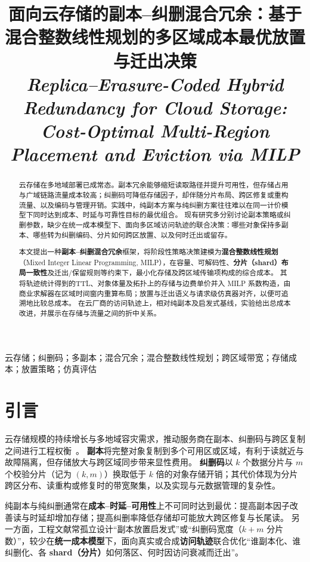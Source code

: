 \documentclass[conference]{IEEEtran}
\title{面向云存储的副本--纠删混合冗余：基于混合整数线性规划的多区域成本最优放置与迁出决策\\[0.35em]
{\normalsize\itshape Replica--Erasure-Coded Hybrid Redundancy for Cloud Storage: Cost-Optimal Multi-Region Placement and Eviction via MILP}}
\author{
\IEEEauthorblockN{作者姓名}
\IEEEauthorblockA{\textit{单位院系}\\
城市，国家，电子邮箱}
}
\begin{document}
\maketitle
\begin{abstract}
云存储在多地域部署已成常态。副本冗余能够缩短读取路径并提升可用性，但存储占用与广域链路流量成本较高；纠删码可降低存储因子，却伴随分片布局、跨区修复或重构流量、以及编码与管理开销。实践中，纯副本方案与纯纠删方案往往难以在同一计价模型下同时达到成本、时延与可靠性目标的最优组合。
现有研究多分别讨论副本策略或纠删参数，缺少在统一成本模型下、面向多区域访问轨迹的联合决策：哪些对象保持多副本、哪些转为纠删编码、分片如何跨区放置、以及何时迁出或留存。

本文提出一种\textbf{副本--纠删混合冗余}框架，将阶段性策略决策建模为\textbf{混合整数线性规划}（Mixed Integer Linear Programming, MILP），在容量、可解码性、\textbf{分片（shard）布局一致性}及迁出/保留规则等约束下，最小化存储及跨区域传输项构成的综合成本。
其将轨迹统计得到的TTL、对象体量及拓扑上的存储与边费单价并入 MILP 系数构造，由商业求解器在区域时间窗内重算布局；放置与迁出语义与请求级仿真器对齐，以便可追溯地比较总成本。
在云厂商的访问轨迹上，相对纯副本及启发式基线，实验给出总成本改进，并展示在存储与流量之间的折中关系。
\end{abstract}

\begin{IEEEkeywords}
云存储；纠删码；多副本；混合冗余；混合整数线性规划；跨区域带宽；存储成本；放置策略；仿真评估
\end{IEEEkeywords}

\section{引言}
云存储规模的持续增长与多地域容灾需求，推动服务商在副本、纠删码与跨区复制之间进行工程权衡~\cite{ref_placeholder}。
\textbf{副本}将完整对象复制到多个可用区或区域，有利于读就近与故障隔离，但存储放大与跨区域同步带来显性费用。
\textbf{纠删码}以 $k$ 个数据分片与 $m$ 个校验分片（记为 $(k,m)$）换取低于 $k$ 倍的对象存储开销；其代价体现为分片跨区分布、读重构或修复时的带宽聚集，以及实现与元数据管理的复杂性。

纯副本与纯纠删通常在\textbf{成本--时延--可用性}上不可同时达到最优：提高副本因子改善读与时延却增加存储；提高纠删率降低存储却可能放大跨区修复与长尾读。
另一方面，工程文献常孤立设计``副本放置启发式''或``纠删码宽度（$k{+}m$ 分片数）''，较少在\textbf{统一成本模型}下，面向真实或合成\textbf{访问轨迹}联合优化``谁副本化、谁纠删化、各 \textbf{shard（分片）}如何落区、何时因访问衰减而迁出''。
\end{document}
